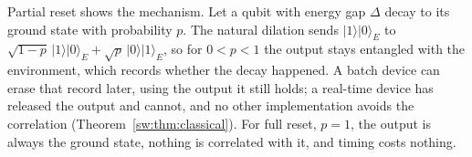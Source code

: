 Partial reset shows the mechanism. Let a qubit with energy gap $\Delta$ decay to its ground state with probability $p$. The natural dilation sends $|1\rangle|0\rangle_E$ to $\sqrt{1-p}\,|1\rangle|0\rangle_E+\sqrt p\,|0\rangle|1\rangle_E$, so for $0<p<1$ the output stays entangled with the environment, which records whether the decay happened. A batch device can erase that record later, using the output it still holds; a real-time device has released the output and cannot, and no other implementation avoids the correlation (Theorem~\ref{sw:thm:classical}). For full reset, $p=1$, the output is always the ground state, nothing is correlated with it, and timing costs nothing.

